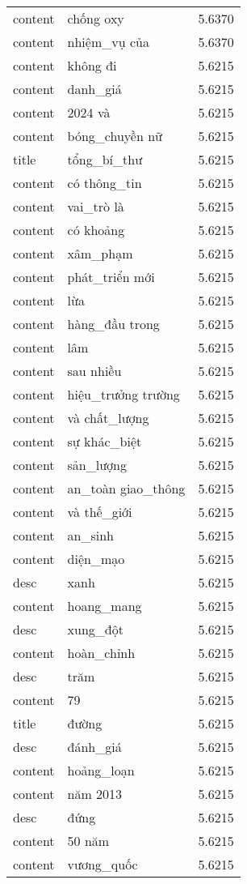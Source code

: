 \documentclass{article}
\begin{document}
\begin{tabular}{lll}
content & chống oxy & 5.6370\\
content & nhiệm\_vụ của & 5.6370\\
content & không đi & 5.6215\\
content & danh\_giá & 5.6215\\
content & 2024 và & 5.6215\\
content & bóng\_chuyền nữ & 5.6215\\
title & tổng\_bí\_thư & 5.6215\\
content & có thông\_tin & 5.6215\\
content & vai\_trò là & 5.6215\\
content & có khoảng & 5.6215\\
content & xâm\_phạm & 5.6215\\
content & phát\_triển mới & 5.6215\\
content & lừa & 5.6215\\
content & hàng\_đầu trong & 5.6215\\
content & lâm & 5.6215\\
content & sau nhiều & 5.6215\\
content & hiệu\_trưởng trường & 5.6215\\
content & và chất\_lượng & 5.6215\\
content & sự khác\_biệt & 5.6215\\
content & sản\_lượng & 5.6215\\
content & an\_toàn giao\_thông & 5.6215\\
content & và thế\_giới & 5.6215\\
content & an\_sinh & 5.6215\\
content & diện\_mạo & 5.6215\\
desc & xanh & 5.6215\\
content & hoang\_mang & 5.6215\\
desc & xung\_đột & 5.6215\\
content & hoàn\_chỉnh & 5.6215\\
desc & trăm & 5.6215\\
content & 79 & 5.6215\\
title & đường & 5.6215\\
desc & đánh\_giá & 5.6215\\
content & hoảng\_loạn & 5.6215\\
content & năm 2013 & 5.6215\\
desc & đứng & 5.6215\\
content & 50 năm & 5.6215\\
content & vương\_quốc & 5.6215\\

\end{tabular}
\end{document}

